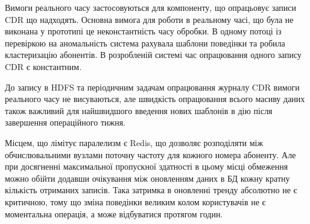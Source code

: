 Вимоги реального часу застосовуються для компоненту, що опрацьовує записи CDR що надходять. Основна вимога для роботи в реальному часі, що була не виконана у прототипі це неконстантність часу обробки. В одному потоці із перевіркою на аномальність система рахувала шаблони поведінки та робила кластеризацію абонентів. В розробленій системі час опрацювання одного запису CDR є константним.

До запису в HDFS та періодичним задачам опрацювання журналу CDR вимоги реального часу не висуваються, але швидкість опрацювання всього масиву даних також важливий для найшвидшого введення нових шаблонів в дію після завершення операційного тижня.

Місцем, що лімітує паралелизм є Redis, що дозволяє розподіляти між обчислювальними вузлами поточну частоту для кожного номера абоненту. Але при досягненні максимальної пропускної здатності в цьому місці обмеження можно обійти додавши очікування між оновленням даних в БД кожну кратну кількість отриманих записів. Така затримка в оновленні тренду абсолютно не є критичною, тому що зміна поведінки великим колом користувачів не є моментальна операція, а може відбуватися протягом годин.
